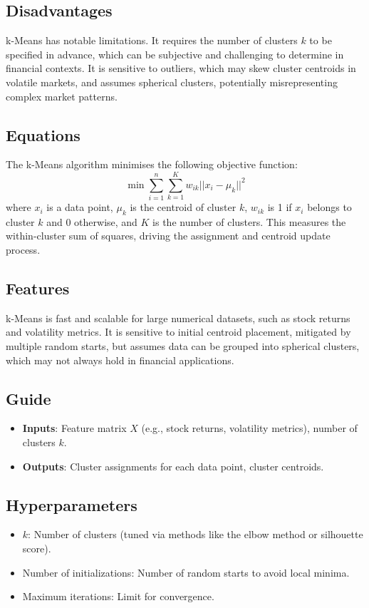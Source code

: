 \documentclass{article}
\begin{document}
\subsection{Disadvantages}
k-Means has notable limitations. It requires the number of clusters \(k\) to be specified in advance, which can be subjective and challenging to determine in financial contexts. It is sensitive to outliers, which may skew cluster centroids in volatile markets, and assumes spherical clusters, potentially misrepresenting complex market patterns.

\subsection{Equations}
The k-Means algorithm minimises the following objective function:
\[
\min \sum_{i=1}^n \sum_{k=1}^K w_{ik} || x_i - \mu_k ||^2
\]
where \(x_i\) is a data point, \(\mu_k\) is the centroid of cluster \(k\), \(w_{ik}\) is 1 if \(x_i\) belongs to cluster \(k\) and 0 otherwise, and \(K\) is the number of clusters. This measures the within-cluster sum of squares, driving the assignment and centroid update process.

\subsection{Features}
k-Means is fast and scalable for large numerical datasets, such as stock returns and volatility metrics. It is sensitive to initial centroid placement, mitigated by multiple random starts, but assumes data can be grouped into spherical clusters, which may not always hold in financial applications.

\subsection{Guide}
\begin{itemize}
    \item \textbf{Inputs}: Feature matrix \(X\) (e.g., stock returns, volatility metrics), number of clusters \(k\).
    \item \textbf{Outputs}: Cluster assignments for each data point, cluster centroids.
\end{itemize}

\subsection{Hyperparameters}
\begin{itemize}
    \item \(k\): Number of clusters (tuned via methods like the elbow method or silhouette score).
    \item Number of initializations: Number of random starts to avoid local minima.
    \item Maximum iterations: Limit for convergence.
\end{itemize}
\end{document}
